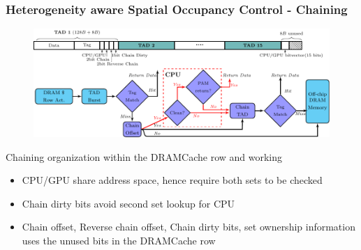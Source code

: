 \documentclass{beamer}
\begin{document}
\begin{frame}
\frametitle{Heterogeneity aware Spatial Occupancy Control - Chaining}
\begin{figure}
\includegraphics[scale=0.7]{chaining}
\end{figure}
Chaining organization within the DRAMCache row and working
\begin{itemize}
	\item CPU/GPU share address space, hence require both sets to be checked
	\item Chain dirty bits avoid second set lookup for CPU
	\item Chain offset, Reverse chain offset, Chain dirty bits, set ownership information uses the unused bits in the DRAMCache row
\end{itemize}
\end{frame}

\end{document}
